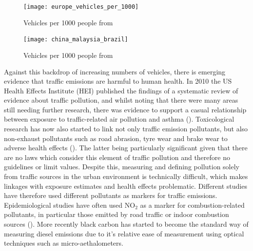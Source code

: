 \begin{figure}[H]
\centering
\texttt{[image: europe\_vehicles\_per\_1000]}
\caption{Vehicles per 1000 people from \cite{TheWorldBank2013}}
\label{fig:europe_vehicles_per_1000}
\end{figure}

\begin{figure}[H]
\centering
\texttt{[image: china\_malaysia\_brazil]}
\caption{Vehicles per 1000 people from \cite{TheWorldBank2013}}
\label{fig:china_malaysia_brazil}
\end{figure}

Against this backdrop of increasing numbers of vehicles, there is emerging evidence that traffic emissions are harmful to human health. In 2010 the US Health Effects Institute (HEI) published the findings of a systematic review of evidence about traffic pollution, and whilst noting that there were many areas still needing further research, there was evidence to support a casual relationship between exposure to traffic-related air pollution and asthma (\cite{HPotHEoT-RA2010}). Toxicological research has now also started to link not only traffic emission pollutants, but also non-exhaust pollutants such as road abrasion, tyre wear and brake wear to adverse health effects (\cite{WorldHealthOrganization2013}). The latter being particularly significant given that there are no laws which consider this element of traffic pollution and therefore no guidelines or limit values. Despite this, measuring and defining pollution solely from traffic sources in the urban environment is technically difficult, which makes linkages with exposure estimates and health effects problematic. Different studies have therefore used different pollutants as markers for traffic emissions. Epidemiological studies have often used NO$_{2}$ as a marker for combustion-related pollutants, in particular those emitted by road traffic or indoor combustion sources (\cite{WorldHealthOrganization2010}). More recently black carbon has started to become the standard way of measuring diesel emissions due to it's relative ease of measurement using optical techniques such as micro-aethalometers.

